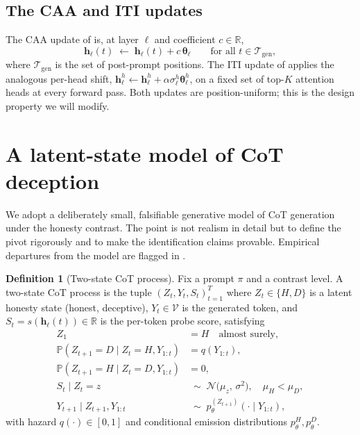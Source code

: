 \documentclass[11pt]{article}
\theoremstyle{definition}
\newtheorem{definition}[theorem]{Definition}
\newcommand{\R}{\mathbb{R}}
\newcommand{\Prob}{\mathbb{P}}
\newcommand{\1}{\mathbf{1}}
\newcommand{\hh}{\bm{h}}
\newcommand{\thetab}{\bm{\theta}}
\begin{document}
\subsection{The CAA and ITI updates}

The CAA update of \citet{panickssery2023caa} is, at layer $\ell$ and coefficient $c \in \R$,
\[
\hh_{\ell}(t) \;\leftarrow\; \hh_{\ell}(t) + c\, \thetab_{\ell} \qquad \text{for all } t \in \mathcal{T}_{\mathrm{gen}},
\]
where $\mathcal{T}_{\mathrm{gen}}$ is the set of post-prompt positions. The ITI update of \citet{li2023iti} applies the analogous per-head shift, $\hh^{h}_{\ell} \leftarrow \hh^{h}_{\ell} + \alpha \sigma^{h}_{\ell} \thetab^{h}_{\ell}$, on a fixed set of top-$K$ attention heads at every forward pass. Both updates are position-uniform; this is the design property we will modify.

\section{A latent-state model of CoT deception}
\label{sec:hmm}

We adopt a deliberately small, falsifiable generative model of CoT generation under the honesty contrast. The point is not realism in detail but to define the pivot rigorously and to make the identification claims provable. Empirical departures from the model are flagged in .

\begin{definition}[Two-state CoT process]
\label{def:two-state}
Fix a prompt $\pi$ and a contrast level. A two-state CoT process is the tuple $(Z_t, Y_t, S_t)_{t=1}^{T}$ where $Z_t \in \{H, D\}$ is a latent honesty state (honest, deceptive), $Y_t \in \mathcal{V}$ is the generated token, and $S_t = s(\hh_{\ell}(t)) \in \R$ is the per-token probe score, satisfying
\begin{align}
Z_1 &= H \quad \text{almost surely},\\
\Prob(Z_{t+1} = D \mid Z_t = H, Y_{1:t}) &= q(Y_{1:t}),\\
\Prob(Z_{t+1} = H \mid Z_t = D, Y_{1:t}) &= 0,\\
S_t \mid Z_t = z &\;\sim\; \mathcal{N}\!\bigl(\mu_z,\, \sigma^2\bigr), \quad \mu_H < \mu_D,\\
Y_{t+1} \mid Z_{t+1}, Y_{1:t} &\;\sim\; p_{\theta}^{(Z_{t+1})}(\cdot \mid Y_{1:t}),
\end{align}
with hazard $q(\cdot) \in [0,1]$ and conditional emission distributions $p_{\theta}^{H}, p_{\theta}^{D}$.
\end{definition}
\end{document}
